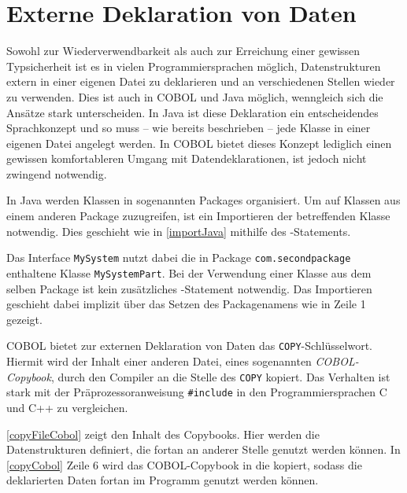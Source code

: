 \section{Externe Deklaration von Daten} \label{copy}
Sowohl zur Wiederverwendbarkeit als auch zur Erreichung einer gewissen Typsicherheit ist es in vielen Programmiersprachen möglich, Datenstrukturen extern in einer eigenen Datei zu deklarieren und an verschiedenen Stellen wieder zu verwenden. Dies ist auch in COBOL und Java möglich, wenngleich sich die Ansätze stark unterscheiden. In Java ist diese Deklaration ein entscheidendes Sprachkonzept und so muss -- wie bereits beschrieben -- jede Klasse in einer eigenen Datei angelegt werden. In COBOL bietet dieses Konzept lediglich einen gewissen komfortableren Umgang mit Datendeklarationen, ist jedoch nicht zwingend notwendig.

In Java werden Klassen in sogenannten Packages organisiert. Um auf Klassen aus einem anderen Package zuzugreifen, ist ein Importieren der betreffenden Klasse notwendig. Dies geschieht wie in \autoref{importJava} mithilfe des -Statements.

Das Interface \texttt{MySystem} nutzt dabei die in Package \texttt{com.secondpackage} enthaltene Klasse \texttt{MySystemPart}. Bei der Verwendung einer Klasse aus dem selben Package ist kein zusätzliches -Statement notwendig. Das Importieren geschieht dabei implizit über das Setzen des Packagenamens wie in Zeile 1 gezeigt.

COBOL bietet zur externen Deklaration von Daten das \texttt{COPY}-Schlüsselwort. Hiermit wird der Inhalt einer anderen Datei, eines sogenannten \textit{COBOL-Copybook}, durch den Compiler an die Stelle des \texttt{COPY} kopiert. Das Verhalten ist stark mit der Präprozessoranweisung \texttt{#include} in den Programmiersprachen C und C++ zu vergleichen.



\autoref{copyFileCobol} zeigt den Inhalt des Copybooks. Hier werden die Datenstrukturen definiert, die fortan an anderer Stelle genutzt werden können. In \autoref{copyCobol} Zeile 6 wird das COBOL-Copybook in die  kopiert, sodass die deklarierten Daten fortan im Programm genutzt werden können.

